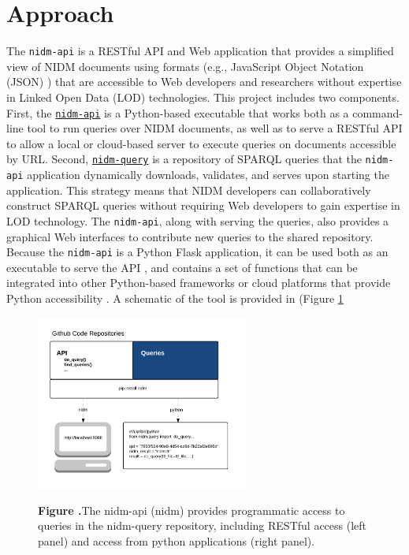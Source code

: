 \documentclass[twocolumn]{bmcart}%
\begin{document}
\section{Approach}\label{approach}
The \texttt{nidm-api} \cite{noauthor_undated-hq} is a RESTful API and Web application that provides a simplified view of NIDM documents using formats (e.g., JavaScript Object Notation (JSON) \cite{Wikipedia_contributors2015-on,noauthor_undated-tz}) that are accessible to Web developers and researchers without expertise in Linked Open Data (LOD) technologies. This project includes two components. First, the \href{https://github.com/incf-nidash/nidm-api}{\texttt{nidm-api}} is a Python-based executable that works both as a command-line tool to run queries over NIDM documents, as well as to serve a RESTful API to allow a local or cloud-based server to execute queries on documents accessible by URL. Second, \href{https://github.com/incf-nidash/nidm-query}{\texttt{nidm-query}} is a repository of SPARQL queries that the \texttt{nidm-api} application dynamically downloads, validates, and serves upon starting the application. This strategy means that NIDM developers can collaboratively construct SPARQL queries without requiring Web developers to gain expertise in LOD technology. The \texttt{nidm-api}, along with serving the queries, also provides a graphical Web interfaces to contribute new queries to the shared repository. Because the \texttt{nidm-api} is a Python Flask \cite{noauthor_undated-ia} application, it can be used both as an executable to serve the API \cite{noauthor_undated-ii}, and contains a set of functions that can be integrated into other Python-based frameworks \cite{noauthor_undated-ej} or cloud platforms that provide Python accessibility \cite{noauthor_undated-jw,Google_undated-aj}. A schematic of the tool is provided in (Figure \ref{fig:01}  \newline \newline

\begin{figure}[h!]
\begin{center}
\includegraphics[width=7cm]{img/figure1}
\end{center}
 \textbf{\label{fig:01}Figure .}{The nidm-api (nidm) provides programmatic access to queries in the nidm-query repository, including RESTful access (left panel) and access from python applications (right panel).}
\end{figure}
\end{document}
